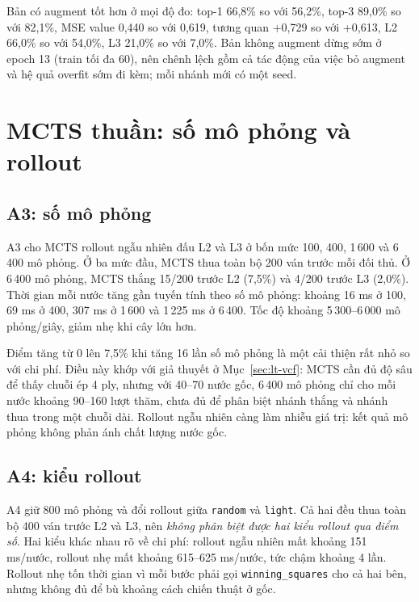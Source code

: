 \begin{table}[H]
  \centering\small
  \caption{A6: so sánh SL v3 (augmentation) và A6 no-aug. Top-1/top-3 và value đo trên tập test
  \texttt{expert\_v2}; Vs L2/L3 là 100 ván mỗi đối thủ.}
  \label{tab:tn-a6}
  
\end{table}

Bản có augment tốt hơn ở mọi độ đo: top-1 66,8\% so với 56,2\%, top-3 89,0\% so với 82,1\%, MSE
value 0,440 so với 0,619, tương quan +0,729 so với +0,613, L2 66,0\% so với 54,0\%, L3 21,0\% so
với 7,0\%. Bản không augment dừng sớm ở epoch 13 (train tối đa 60), nên chênh lệch gồm cả tác động
của việc bỏ augment và hệ quả overfit sớm đi kèm; mỗi nhánh mới có một seed.

\section{MCTS thuần: số mô phỏng và rollout}
\label{sec:tn-mcts}
\subsection{A3: số mô phỏng}
\begin{table}[H]
  \centering\small
  \caption{A3/A4: điểm, thời gian mỗi nước và tốc độ mô phỏng của MCTS trước L2 và L3. Mỗi ô
  có 200 ván.}
  \label{tab:tn-a3a4}
  
\end{table}
A3 cho MCTS rollout ngẫu nhiên đấu L2 và L3 ở bốn mức 100, 400, 1\,600 và 6\,400 mô phỏng.
Ở ba mức đầu, MCTS thua toàn bộ 200 ván trước mỗi đối thủ. Ở 6\,400 mô phỏng, MCTS thắng 15/200
trước L2 (7,5\%) và 4/200 trước L3 (2,0\%). Thời gian mỗi nước tăng gần tuyến tính theo số mô
phỏng: khoảng 16 ms ở 100, 69 ms ở 400, 307 ms ở 1\,600 và 1\,225 ms ở 6\,400. Tốc độ khoảng
5\,300--6\,000 mô phỏng/giây, giảm nhẹ khi cây lớn hơn.

Điểm tăng từ 0 lên 7,5\% khi tăng 16 lần số mô phỏng là một cải thiện rất nhỏ so với chi phí.
Điều này khớp với giả thuyết ở Mục~\ref{sec:lt-vcf}: MCTS cần đủ độ sâu để thấy chuỗi ép 4 ply,
nhưng với 40--70 nước gốc, 6\,400 mô phỏng chỉ cho mỗi nước khoảng 90--160 lượt thăm, chưa đủ
để phân biệt nhánh thắng và nhánh thua trong một chuỗi dài. Rollout ngẫu nhiên càng làm nhiễu
giá trị: kết quả mô phỏng không phản ánh chất lượng nước gốc.

\subsection{A4: kiểu rollout}
A4 giữ 800 mô phỏng và đổi rollout giữa \texttt{random} và \texttt{light}. Cả hai đều thua
toàn bộ 400 ván trước L2 và L3, nên \emph{không phân biệt được hai kiểu rollout qua điểm số}.
Hai kiểu khác nhau rõ về chi phí: rollout ngẫu nhiên mất khoảng 151 ms/nước, rollout nhẹ mất
khoảng 615--625 ms/nước, tức chậm khoảng 4 lần. Rollout nhẹ tốn thời gian vì mỗi bước phải gọi
\texttt{winning\_squares} cho cả hai bên, nhưng không đủ để bù khoảng cách chiến thuật ở gốc.

